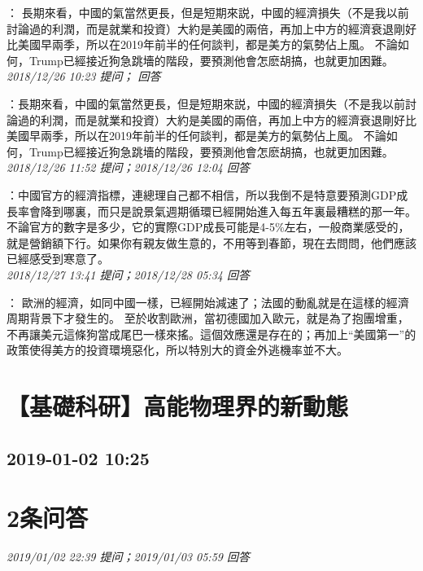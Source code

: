 \documentclass[twocolumn]{ctexart}
\begin{document}
：
長期來看，中國的氣當然更長，但是短期來説，中國的經濟損失（不是我以前討論過的利潤，而是就業和投資）大約是美國的兩倍，再加上中方的經濟衰退剛好比美國早兩季，所以在2019年前半的任何談判，都是美方的氣勢佔上風。 
不論如何，Trump已經接近狗急跳墻的階段，要預測他會怎麽胡搞，也就更加困難。
\\

\textit{\hfill\noindent\small 2018/12/26 10:23 提问； 回答}

：長期來看，中國的氣當然更長，但是短期來説，中國的經濟損失（不是我以前討論過的利潤，而是就業和投資）大約是美國的兩倍，再加上中方的經濟衰退剛好比美國早兩季，所以在2019年前半的任何談判，都是美方的氣勢佔上風。 不論如何，Trump已經接近狗急跳墻的階段，要預測他會怎麽胡搞，也就更加困難。\\

\textit{\hfill\noindent\small 2018/12/26 11:52 提问；2018/12/26 12:04 回答}

：中國官方的經濟指標，連總理自己都不相信，所以我倒不是特意要預測GDP成長率會降到哪裏，而只是說景氣週期循環已經開始進入每五年裏最糟糕的那一年。不論官方的數字是多少，它的實際GDP成長可能是4-5\%左右，一般商業感受的，就是營銷額下行。如果你有親友做生意的，不用等到春節，現在去問問，他們應該已經感受到寒意了。
\\

\textit{\hfill\noindent\small 2018/12/27 13:41 提问；2018/12/28 05:34 回答}

：
歐洲的經濟，如同中國一樣，已經開始減速了；法國的動亂就是在這樣的經濟周期背景下才發生的。
至於收割歐洲，當初德國加入歐元，就是為了抱團增重，不再讓美元這條狗當成尾巴一樣來搖。這個效應還是存在的；再加上“美國第一”的政策使得美方的投資環境惡化，所以特別大的資金外逃機率並不大。
\\


\section{【基礎科研】高能物理界的新動態}
\subsection{2019-01-02 10:25}


\section{2条问答}

\textit{\hfill\noindent\small 2019/01/02 22:39 提问；2019/01/03 05:59 回答}
\end{document}
